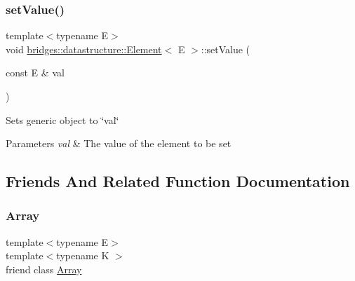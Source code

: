 \subsubsection{\texorpdfstring{set\+Value()}{setValue()}}
{\footnotesize\ttfamily template$<$typename E$>$ \\
void \hyperlink{classbridges_1_1datastructure_1_1_element}{bridges\+::datastructure\+::\+Element}$<$ E $>$\+::set\+Value (\begin{DoxyParamCaption}\item[{const E \&}]{val }\end{DoxyParamCaption})\hspace{0.3cm}{\ttfamily [inline]}}

Sets generic object to \char`\"{}val\char`\"{}


\begin{DoxyParams}{Parameters}
{\em val} & The value of the element to be set \\
\hline
\end{DoxyParams}


\subsection{Friends And Related Function Documentation}
\mbox{\label{classbridges_1_1datastructure_1_1_element_ab1a595168ea1870ce436dfd2d8e69b6d}} 
\subsubsection{\texorpdfstring{Array}{Array}}
{\footnotesize\ttfamily template$<$typename E$>$ \\
template$<$typename K $>$ \\
friend class \hyperlink{classbridges_1_1datastructure_1_1_array}{Array}\hspace{0.3cm}{\ttfamily [friend]}}

\mbox{\label{classbridges_1_1datastructure_1_1_element_a71a2fa1cdcc1e193c1790c39b8267780}} 
